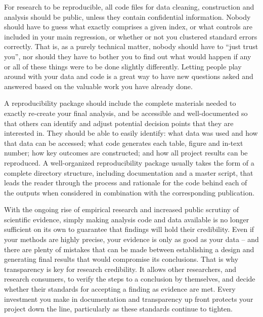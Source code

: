 For research to be reproducible,
all code files for data cleaning, construction and analysis
should be public, unless they contain confidential information.
Nobody should have to guess what exactly comprises a given index,
or what controls are included in your main regression,
or whether or not you clustered standard errors correctly.
That is, as a purely technical matter, nobody should have to ``just trust you'',
nor should they have to bother you to find out what would happen
if any or all of these things were to be done slightly differently.\cite{simmons2011false,simonsohn2015specification,wicherts2016degrees}
Letting people play around with your data and code
is a great way to have new questions asked and answered
based on the valuable work you have already done.

A reproducibility package should include the complete materials needed
to exactly re-create your final analysis,
and be accessible and well-documented so that others can identify
and adjust potential decision points that they are interested in.
They should be able to easily identify:
what data was used and how that data can be accessed;
what code generates each table, figure and in-text number;
how key outcomes are constructed;
and how all project results can be reproduced.
A well-organized reproducibility package usually takes the form
of a complete directory structure, including documentation and a master script,
that leads the reader through the process and rationale
for the code behind each of the outputs
when considered in combination with the corresponding publication.

\bigskip
With the ongoing rise of empirical research and increased public scrutiny of scientific evidence,
simply making analysis code and data available
is no longer sufficient on its own to guarantee that findings will hold their credibility.
Even if your methods are highly precise,
your evidence is only as good as your data --
and there are plenty of mistakes that can be made between
establishing a design and generating final results that would compromise its conclusions.
That is why transparency is key for research credibility.
It allows other researchers, and research consumers,
to verify the steps to a conclusion by themselves,
and decide whether their standards for accepting a finding as evidence are met.
Every investment you make in documentation and transparency up front
protects your project down the line, particularly as these standards continue to tighten.

